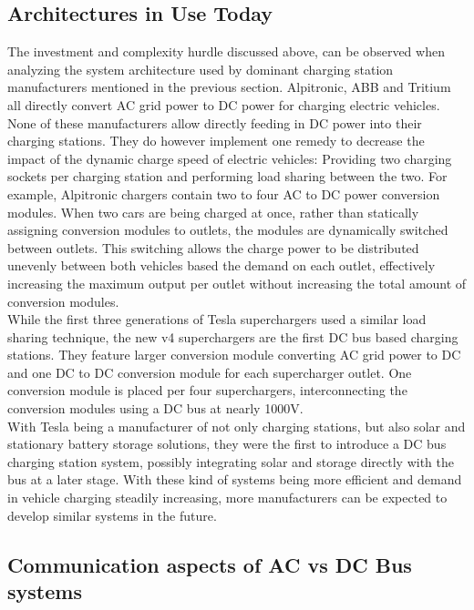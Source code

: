 \documentclass[conference,flushend]{iaria} %
\begin{document}
\subsection{Architectures in Use Today}
The investment and complexity hurdle discussed above, can be observed when analyzing the system architecture used by dominant charging station manufacturers mentioned in the previous section.
Alpitronic, ABB and Tritium all directly convert AC grid power to DC power for charging electric vehicles.
None of these manufacturers allow directly feeding in DC power into their charging stations.
They do however implement one remedy to decrease the impact of the dynamic charge speed of electric vehicles: Providing two charging sockets per charging station and performing load sharing between the two.
For example, Alpitronic chargers contain two to four AC to DC power conversion modules.
When two cars are being charged at once, rather than statically assigning conversion modules to outlets, the modules are dynamically switched between outlets.
This switching allows the charge power to be distributed unevenly between both vehicles based the demand on each outlet, effectively increasing the maximum output per outlet without increasing the total amount of conversion modules. \\
While the first three generations of Tesla superchargers used a similar load sharing technique, the new v4 superchargers are the first DC bus based charging stations.
They feature larger conversion module converting AC grid power to DC and one DC to DC conversion module for each supercharger outlet.
One conversion module is placed per four superchargers, interconnecting the conversion modules using a DC bus at nearly 1000V. \\
With Tesla being a manufacturer of not only charging stations, but also solar and stationary battery storage solutions, they were the first to introduce a DC bus charging station system, possibly integrating solar and storage directly with the bus at a later stage.
With these kind of systems being more efficient and demand in vehicle charging steadily increasing, more manufacturers can be expected to develop similar systems in the future.

\subsection{Communication aspects of AC vs DC Bus systems}

\fi
\end{document}
